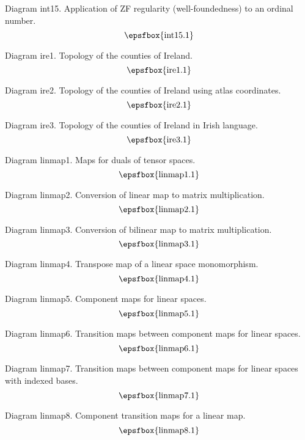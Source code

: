 \filleject

Diagram int15. Application of ZF regularity (well-foundedness) to an ordinal
number.
$$
\centerline{\epsfbox{int15.1}}
$$

\secteject
\edef\SECTire{\the\pageno}

Diagram ire1. Topology of the counties of Ireland.
$$
\centerline{\epsfbox{ire1.1}}
$$

Diagram ire2. Topology of the counties of Ireland using atlas coordinates.
$$
\centerline{\epsfbox{ire2.1}}
$$

\filleject

Diagram ire3. Topology of the counties of Ireland in Irish language.
$$
\centerline{\epsfbox{ire3.1}}
$$

\secteject
\edef\SECTlinmap{\the\pageno}

Diagram linmap1. Maps for duals of tensor spaces.
$$
\centerline{\epsfbox{linmap1.1}}
$$

Diagram linmap2. Conversion of linear map to matrix multiplication.
$$
\centerline{\epsfbox{linmap2.1}}
$$

Diagram linmap3. Conversion of bilinear map to matrix multiplication.
$$
\centerline{\epsfbox{linmap3.1}}
$$

\filleject

Diagram linmap4. Transpose map of a linear space monomorphism.
$$
\centerline{\epsfbox{linmap4.1}}
$$

Diagram linmap5. Component maps for linear spaces.
$$
\centerline{\epsfbox{linmap5.1}}
$$

Diagram linmap6. Transition maps between component maps for linear spaces.
$$
\centerline{\epsfbox{linmap6.1}}
$$

Diagram linmap7. Transition maps between component maps for linear spaces with
indexed bases.
$$
\centerline{\epsfbox{linmap7.1}}
$$

\filleject

Diagram linmap8. Component transition maps for a linear map.
$$
\centerline{\epsfbox{linmap8.1}}
$$


